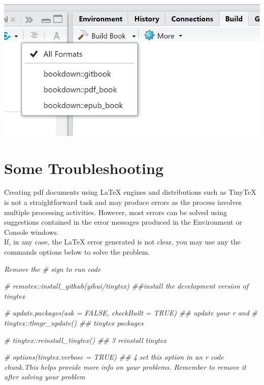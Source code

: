 \documentclass[
]{book}
\newenvironment{Shaded}{\begin{snugshade}}{\end{snugshade}}
\newcommand{\CommentTok}[1]{\textcolor[rgb]{0.56,0.35,0.01}{\textit{#1}}}
\let\origfigure\figure
\let\endorigfigure\endfigure
\renewenvironment{figure}[1][2] {
    \expandafter\origfigure\expandafter[H]
} {
    \endorigfigure
}
\begin{document}
\begin{figure}
\centering
\includegraphics{tutorial_screenshots/build_book_drop_down.png}
\caption{Build book format options}
\end{figure}

\hypertarget{some-troubleshooting}{%
\section{Some Troubleshooting}\label{some-troubleshooting}}

Creating pdf documents using LaTeX engines and distributions such as TinyTeX is not a straightforward task and may produce errors as the process involves multiple processing activities. However, most errors can be solved using suggestions contained in the error messages produced in the Environment or Console windows.\\
If, in any case, the LaTeX error generated is not clear, you may use any the commands options below to solve the problem.

\emph{Remove the \# sign to run code}

\begin{Shaded}
\begin{Highlighting}[]
\CommentTok{\# remotes::install\_github(\textquotesingle{}yihui/tinytex\textquotesingle{}) \#\#install the development version of tinytex}

\CommentTok{\# update.packages(ask = FALSE, checkBuilt = TRUE) \#\# update your r and}
\CommentTok{\# tinytex::tlmgr\_update() \#\# tinytex packages}

\CommentTok{\# tinytex::reinstall\_tinytex()  \#\# 3 reinstall tinytex}

\CommentTok{\# options(tinytex.verbose = TRUE) \#\# 4 set this option in an r code chunk.This helps provide more info on your problems. Remember to remove it after solving your problem}
\end{Highlighting}
\end{Shaded}
\end{document}
